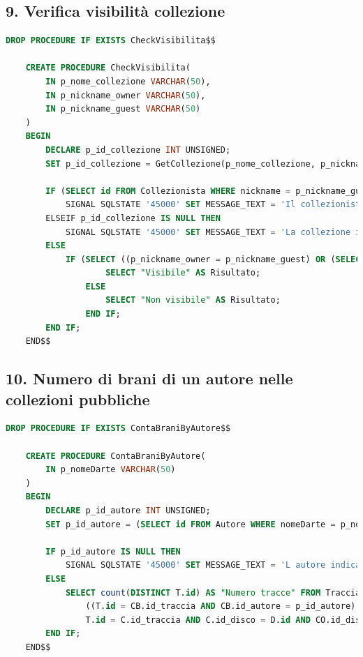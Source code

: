 \documentclass{article}
\begin{document}
\subsection*{9. Verifica visibilità collezione}
\begin{lstlisting}[language=SQL]
    DROP PROCEDURE IF EXISTS CheckVisibilita$$
    
    CREATE PROCEDURE CheckVisibilita(
        IN p_nome_collezione VARCHAR(50),
        IN p_nickname_owner VARCHAR(50),
        IN p_nickname_guest VARCHAR(50)
    )
    BEGIN
        DECLARE p_id_collezione INT UNSIGNED;
        SET p_id_collezione = GetCollezione(p_nome_collezione, p_nickname_owner);
        
        IF (SELECT id FROM Collezionista WHERE nickname = p_nickname_guest) IS NULL THEN
            SIGNAL SQLSTATE '45000' SET MESSAGE_TEXT = 'Il collezionista indicato non esiste';
        ELSEIF p_id_collezione IS NULL THEN
            SIGNAL SQLSTATE '45000' SET MESSAGE_TEXT = 'La collezione indicata non esiste';
        ELSE
            IF (SELECT ((p_nickname_owner = p_nickname_guest) OR (SELECT isPubblica FROM Collezione WHERE id = p_id_collezione) = TRUE OR EXISTS (SELECT * FROM Condivide WHERE id_collezione = p_id_collezione AND id_collezionista = (SELECT id FROM Collezionista WHERE nickname = p_nickname_guest)))) = true THEN
                    SELECT "Visibile" AS Risultato;
                ELSE
                    SELECT "Non visibile" AS Risultato;
                END IF;    
        END IF;
    END$$
\end{lstlisting}

\subsection*{10. Numero di brani di un autore nelle collezioni pubbliche}
\begin{lstlisting}[language=SQL]
    DROP PROCEDURE IF EXISTS ContaBraniByAutore$$

    CREATE PROCEDURE ContaBraniByAutore(
        IN p_nomeDarte VARCHAR(50)
    )
    BEGIN
        DECLARE p_id_autore INT UNSIGNED;
        SET p_id_autore = (SELECT id FROM Autore WHERE nomeDarte = p_nomeDarte);
        
        IF p_id_autore IS NULL THEN
            SIGNAL SQLSTATE '45000' SET MESSAGE_TEXT = 'L autore indicato non esiste';
        ELSE
            SELECT count(DISTINCT T.id) AS "Numero tracce" FROM Traccia T, Disco D, Contiene C, Collezione CZ, Copia CO, Contribuisce CB, Collabora CL WHERE 
                ((T.id = CB.id_traccia AND CB.id_autore = p_id_autore) OR (D.id = CL.id_disco AND CL.id_autore = p_id_autore AND T.id = C.id_traccia AND C.id_disco = D.id) OR (D.id_autore = p_id_autore AND T.id = C.id_traccia AND C.id_disco = D.id)) AND 
                T.id = C.id_traccia AND C.id_disco = D.id AND CO.id_disco = D.id AND CO.id_collezione = CZ.id AND CZ.isPubblica = true;
        END IF;
    END$$
\end{lstlisting}
\end{document}
